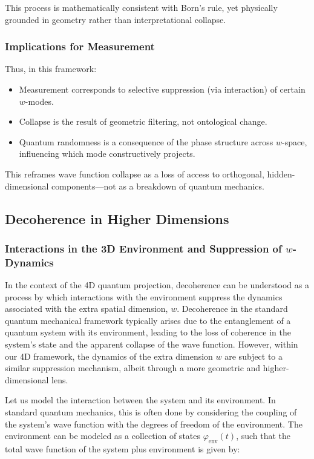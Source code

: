 \documentclass[12pt]{article}
\begin{document}
This process is mathematically consistent with Born's rule, yet physically grounded in geometry rather than interpretational collapse.

\subsubsection{Implications for Measurement}

Thus, in this framework:

\begin{itemize}
    \item Measurement corresponds to selective suppression (via interaction) of certain \( w \)-modes.
    \item Collapse is the result of geometric filtering, not ontological change.
    \item Quantum randomness is a consequence of the phase structure across \( w \)-space, influencing which mode constructively projects.
\end{itemize}

This reframes wave function collapse as a loss of access to orthogonal, hidden-dimensional components—not as a breakdown of quantum mechanics.

\subsection{Decoherence in Higher Dimensions}

\subsubsection{Interactions in the 3D Environment and Suppression of \( w \)-Dynamics}

In the context of the 4D quantum projection, decoherence can be understood as a process by which interactions with the environment suppress the dynamics associated with the extra spatial dimension, \( w \). Decoherence in the standard quantum mechanical framework typically arises due to the entanglement of a quantum system with its environment, leading to the loss of coherence in the system's state and the apparent collapse of the wave function. However, within our 4D framework, the dynamics of the extra dimension \( w \) are subject to a similar suppression mechanism, albeit through a more geometric and higher-dimensional lens.

Let us model the interaction between the system and its environment. In standard quantum mechanics, this is often done by considering the coupling of the system's wave function with the degrees of freedom of the environment. The environment can be modeled as a collection of states \( \varphi_{\text{env}}(t) \), such that the total wave function of the system plus environment is given by:
\end{document}
